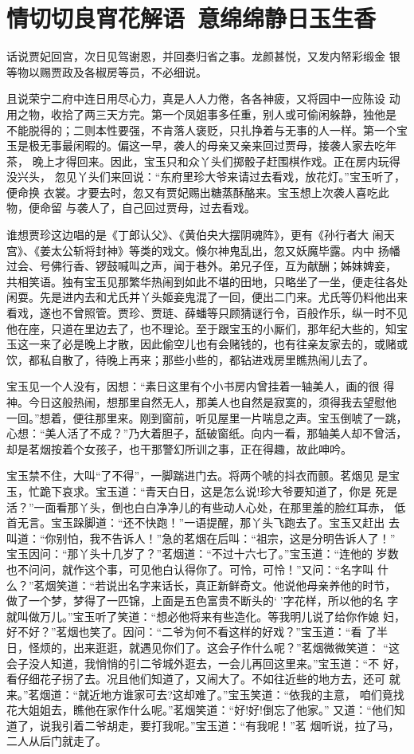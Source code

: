 \chapter{情切切良宵花解语~意绵绵静日玉生香}

话说贾妃回宫，次日见驾谢恩，并回奏归省之事。龙颜甚悦，又发内帑彩缎金
银等物以赐贾政及各椒房等员，不必细说。

且说荣宁二府中连日用尽心力，真是人人力倦，各各神疲，又将园中一应陈设
动用之物，收拾了两三天方完。第一个凤姐事多任重，别人或可偷闲躲静，独他是
不能脱得的；二则本性要强，不肯落人褒贬，只扎挣着与无事的人一样。第一个宝
玉是极无事最闲暇的。偏这一早，袭人的母亲又亲来回过贾母，接袭人家去吃年茶，
晚上才得回来。因此，宝玉只和众丫头们掷骰子赶围棋作戏。正在房内玩得没兴头，
忽见丫头们来回说：“东府里珍大爷来请过去看戏，放花灯。”宝玉听了，便命换
衣裳。才要去时，忽又有贾妃赐出糖蒸酥酪来。宝玉想上次袭人喜吃此物，便命留
与袭人了，自己回过贾母，过去看戏。

谁想贾珍这边唱的是《丁郎认父》、《黄伯央大摆阴魂阵》，更有《孙行者大
闹天宫》、《姜太公斩将封神》等类的戏文。倏尔神鬼乱出，忽又妖魔毕露。内中
扬幡过会、号佛行香、锣鼓喊叫之声，闻于巷外。弟兄子侄，互为献酬；姊妹婢妾，
共相笑语。独有宝玉见那繁华热闹到如此不堪的田地，只略坐了一坐，便走往各处
闲耍。先是进内去和尤氏并丫头姬妾鬼混了一回，便出二门来。尤氏等仍料他出来
看戏，遂也不曾照管。贾珍、贾琏、薛蟠等只顾猜谜行令，百般作乐，纵一时不见
他在座，只道在里边去了，也不理论。至于跟宝玉的小厮们，那年纪大些的，知宝
玉这一来了必是晚上才散，因此偷空儿也有会赌钱的，也有往亲友家去的，或赌或
饮，都私自散了，待晚上再来；那些小些的，都钻进戏房里瞧热闹儿去了。

宝玉见一个人没有，因想：“素日这里有个小书房内曾挂着一轴美人，画的很
得神。今日这般热闹，想那里自然无人，那美人也自然是寂寞的，须得我去望慰他
一回。”想着，便往那里来。刚到窗前，听见屋里一片喘息之声。宝玉倒唬了一跳，
心想：“美人活了不成？”乃大着胆子，舐破窗纸。向内一看，那轴美人却不曾活，
却是茗烟按着个女孩子，也干那警幻所训之事，正在得趣，故此呻吟。

宝玉禁不住，大叫“了不得”，一脚踹进门去。将两个唬的抖衣而颤。茗烟见
是宝玉，忙跪下哀求。宝玉道：“青天白日，这是怎么说!珍大爷要知道了，你是
死是活？”一面看那丫头，倒也白白净净儿的有些动人心处，在那里羞的脸红耳赤，
低首无言。宝玉跺脚道：“还不快跑！”一语提醒，那丫头飞跑去了。宝玉又赶出
去叫道：“你别怕，我不告诉人！”急的茗烟在后叫：“祖宗，这是分明告诉人了！”
宝玉因问：“那丫头十几岁了？”茗烟道：“不过十六七了。”宝玉道：“连他的
岁数也不问问，就作这个事，可见他白认得你了。可怜，可怜！”又问：“名字叫
什么？”茗烟笑道：“若说出名字来话长，真正新鲜奇文。他说他母亲养他的时节，
做了一个梦，梦得了一匹锦，上面是五色富贵不断头的‘’字花样，所以他的名
字就叫做万儿。”宝玉听了笑道：“想必他将来有些造化。等我明儿说了给你作媳
妇，好不好？”茗烟也笑了。因问：“二爷为何不看这样的好戏？”宝玉道：“看
了半日，怪烦的，出来逛逛，就遇见你们了。这会子作什么呢？”茗烟微微笑道：
“这会子没人知道，我悄悄的引二爷城外逛去，一会儿再回这里来。”宝玉道：“不
好，看仔细花子拐了去。况且他们知道了，又闹大了。不如往近些的地方去，还可
就来。”茗烟道：“就近地方谁家可去?这却难了。”宝玉笑道：“依我的主意，
咱们竟找花大姐姐去，瞧他在家作什么呢。”茗烟笑道：“好!好!倒忘了他家。”
又道：“他们知道了，说我引着二爷胡走，要打我呢。”宝玉道：“有我呢！”茗
烟听说，拉了马，二人从后门就走了。

